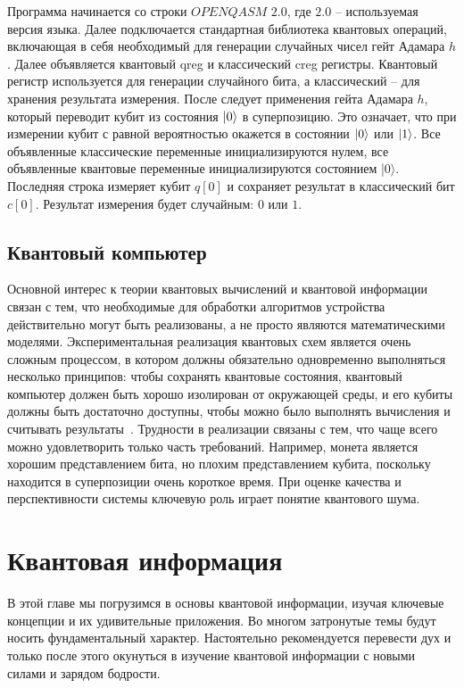 \documentclass[12pt,a4paper]{article}
\begin{document}
	Программа начинается со строки $OPENQASM$ $2.0$, где $2.0$ -- используемая версия языка.
	Далее подключается стандартная библиотека квантовых операций, включающая в себя необходимый для генерации случайных чисел гейт Адамара $h$. Далее объявляется квантовый qreg и классический creg регистры. Квантовый регистр используется для генерации случайного бита, а классический -- для хранения результата измерения. После следует применения гейта Адамара $h$, который переводит кубит из состояния $\ket{0}$ в суперпозицию. Это означает, что при измерении кубит с равной вероятностью окажется в состоянии  $\ket{0}$ или  $\ket{1}$.
	Все объявленные классические переменные инициализируются нулем, все объявленные квантовые переменные инициализируются состоянием |0$\rangle$. Последняя строка измеряет кубит $q[0]$ и сохраняет результат в классический бит $c[0]$. Результат измерения будет случайным: $0 $ или $1$.	
	
	\subsection{Квантовый компьютер}
	
	Основной интерес к теории квантовых вычислений и квантовой информации связан с тем, что необходимые для обработки алгоритмов устройства действительно могут быть реализованы, а не просто являются математическими моделями. Экспериментальная реализация квантовых схем является очень сложным процессом, в котором должны обязательно одновременно выполняться несколько принципов: чтобы сохранять квантовые состояния, квантовый компьютер должен быть хорошо изолирован от окружающей среды, и его кубиты должны быть достаточно доступны, чтобы можно было выполнять вычисления и считывать результаты~\cite{1}. Трудности в реализации связаны с тем, что чаще всего можно удовлетворить только часть требований. Например, монета является хорошим представлением бита, но плохим представлением кубита, поскольку находится в суперпозиции очень короткое время. При оценке качества  и перспективности системы ключевую роль играет понятие квантового шума.
	
		\section{Квантовая информация}
		В этой главе мы погрузимся в основы квантовой информации, изучая ключевые концепции и их удивительные приложения. Во многом затронутые темы будут носить фундаментальный характер. Настоятельно рекомендуется перевести дух и только после этого окунуться в изучение квантовой информации с новыми силами и зарядом бодрости.
\end{document}
